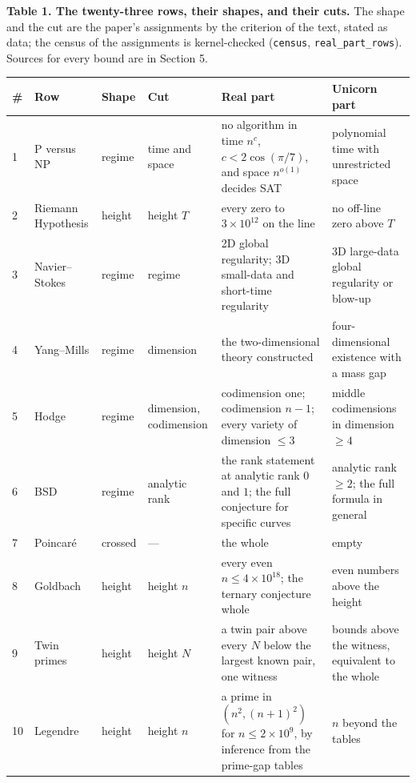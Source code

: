 \documentclass[10pt,twocolumn]{article}
\begin{document}
\begin{table}[!t]
\centering\scriptsize
\renewcommand{\arraystretch}{1.12}
\raggedright \textbf{Table 1. The twenty-three rows, their shapes, and their cuts.} The shape and the cut are the paper's assignments by the criterion of the text, stated as data; the census of the assignments is kernel-checked (\texttt{census}, \texttt{real\_part\_rows}). Sources for every bound are in Section 5.\par\smallskip
\begin{tabularx}{\textwidth}{@{}P{0.02\textwidth} P{0.13\textwidth} P{0.05\textwidth} P{0.10\textwidth} L L@{}}
\toprule
\textbf{\#} & \textbf{Row} & \textbf{Shape} & \textbf{Cut} & \textbf{Real part} & \textbf{Unicorn part} \\
 & P versus NP & regime & time and space & no algorithm in time $n^{c}$, $c < 2\cos(\pi/7)$, and space $n^{o(1)}$ decides SAT & polynomial time with unrestricted space \\
2 & Riemann Hypothesis & height & height $T$ & every zero to $3 \times 10^{12}$ on the line & no off-line zero above $T$ \\
3 & Navier--Stokes & regime & regime & 2D global regularity; 3D small-data and short-time regularity & 3D large-data global regularity or blow-up \\
4 & Yang--Mills & regime & dimension & the two-dimensional theory constructed & four-dimensional existence with a mass gap \\
5 & Hodge & regime & dimension, codimension & codimension one; codimension $n-1$; every variety of dimension $\le 3$ & middle codimensions in dimension $\ge 4$ \\
6 & BSD & regime & analytic rank & the rank statement at analytic rank $0$ and $1$; the full conjecture for specific curves & analytic rank $\ge 2$; the full formula in general \\
7 & Poincaré & crossed & --- & the whole & empty \\
8 & Goldbach & height & height $n$ & every even $n \le 4 \times 10^{18}$; the ternary conjecture whole & even numbers above the height \\
9 & Twin primes & height & height $N$ & a twin pair above every $N$ below the largest known pair, one witness & bounds above the witness, equivalent to the whole \\
10 & Legendre & height & height $n$ & a prime in $(n^2, (n+1)^2)$ for $n \le 2 \times 10^9$, by inference from the prime-gap tables & $n$ beyond the tables \\

\end{tabularx}
\end{table}
\end{document}
